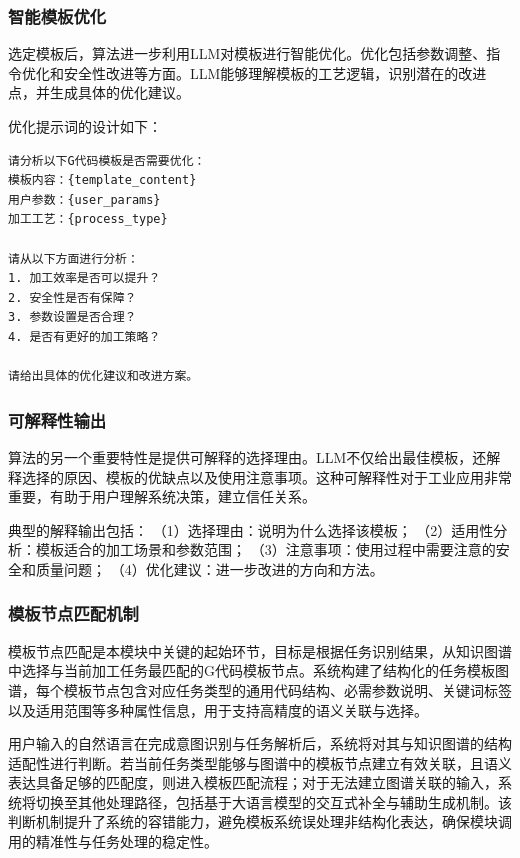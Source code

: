 \documentclass[preprint,12pt]{elsarticle}
\begin{document}
\subsubsection{智能模板优化}

选定模板后，算法进一步利用LLM对模板进行智能优化。优化包括参数调整、指令优化和安全性改进等方面。LLM能够理解模板的工艺逻辑，识别潜在的改进点，并生成具体的优化建议。

优化提示词的设计如下：

\begin{verbatim}
请分析以下G代码模板是否需要优化：
模板内容：{template_content}
用户参数：{user_params}
加工工艺：{process_type}

请从以下方面进行分析：
1. 加工效率是否可以提升？
2. 安全性是否有保障？
3. 参数设置是否合理？
4. 是否有更好的加工策略？

请给出具体的优化建议和改进方案。
\end{verbatim}

\subsubsection{可解释性输出}

算法的另一个重要特性是提供可解释的选择理由。LLM不仅给出最佳模板，还解释选择的原因、模板的优缺点以及使用注意事项。这种可解释性对于工业应用非常重要，有助于用户理解系统决策，建立信任关系。

典型的解释输出包括：
（1）选择理由：说明为什么选择该模板；
（2）适用性分析：模板适合的加工场景和参数范围；
（3）注意事项：使用过程中需要注意的安全和质量问题；
（4）优化建议：进一步改进的方向和方法。

\subsubsection{模板节点匹配机制}

模板节点匹配是本模块中关键的起始环节，目标是根据任务识别结果，从知识图谱中选择与当前加工任务最匹配的G代码模板节点。系统构建了结构化的任务模板图谱，每个模板节点包含对应任务类型的通用代码结构、必需参数说明、关键词标签以及适用范围等多种属性信息，用于支持高精度的语义关联与选择。

用户输入的自然语言在完成意图识别与任务解析后，系统将对其与知识图谱的结构适配性进行判断。若当前任务类型能够与图谱中的模板节点建立有效关联，且语义表达具备足够的匹配度，则进入模板匹配流程；对于无法建立图谱关联的输入，系统将切换至其他处理路径，包括基于大语言模型的交互式补全与辅助生成机制。该判断机制提升了系统的容错能力，避免模板系统误处理非结构化表达，确保模块调用的精准性与任务处理的稳定性。
\end{document}
